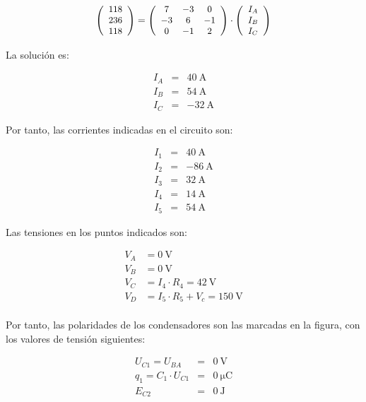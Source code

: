 \documentclass[10pt]{article}
\begin{document}
\[
\small{
\left(\begin{array}{c}
    118\\
    236\\
    118
  \end{array}\right) = \left(\begin{array}{ccc}
    7 & -3 & 0\\
    -3 & 6 & -1\\
    0 & -1 & 2
  \end{array}\right) \cdot \left(\begin{array}{c}
    I_{A}\\
    I_{B}\\
    I_{C}
  \end{array}\right)
}
\]

La solución es:

\begin{eqnarray*}
I_A & = & \SI{40}{\ampere}\\
I_B & = & \SI{54}{\ampere}\\
I_C & = & -\SI{32}{\ampere}
\end{eqnarray*}

Por tanto, las corrientes indicadas en el circuito son:

\begin{eqnarray*}
I_1 & = & \SI{40}{\ampere}\\
I_2 & = & \SI{-86}{\ampere}\\
I_3 & = &  \SI{32}{\ampere}\\
I_4 & = &  \SI{14}{\ampere}\\
I_5 & = &  \SI{54}{\ampere}
\end{eqnarray*}

Las tensiones en los puntos indicados son:

\begin{align*}
V_A &= \SI{0}{\volt}\\
V_B &= \SI{0}{\volt}\\
V_C &= I_4 \cdot R_4 = \SI{42}{\volt}\\
V_D &= I_5 \cdot R_5 + V_c = \SI{150}{\volt}\\
\end{align*}

Por tanto, las polaridades de los condensadores son las marcadas en la figura, con los valores de tensión siguientes:

\begin{eqnarray*}
U_{C1} = U_{BA} & = & \SI{0}{\volt}\\
q_1 = C_1 \cdot U_{C1} & = & \SI{0}{\micro\coulomb}\\
E_{C2} & = & \SI{0}{\joule}
\end{eqnarray*}
\end{document}
